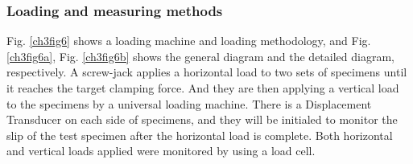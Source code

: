 \subsubsection{Loading and measuring methods}

Fig. \ref{ch3fig6} shows a loading machine and loading methodology, and Fig. \ref{ch3fig6a}, Fig. \ref{ch3fig6b} shows the general diagram and the detailed diagram, respectively. A screw-jack applies a horizontal load to two sets of specimens until it reaches the target clamping force. And they are then applying a vertical load to the specimens by a universal loading machine. There is a Displacement Transducer on each side of specimens, and they will be initialed to monitor the slip of the test specimen after the horizontal load is complete. Both horizontal and vertical loads applied were monitored by using a load cell.

